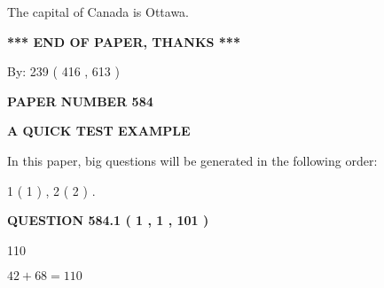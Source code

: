 \documentclass[12pt]{article}
\begin{document}
 
The capital of Canada is Ottawa.
 
 
 
 
   
   
 \vspace{0.2in}
 
   
   
   
   
\vspace{1.0in} 
{\textbf{\large{ *** END OF PAPER, THANKS *** }}} 
   
   
\hspace{1.0in} By: 
 239 ( 416 ,  613 )
   
   
   
   
\newpage 
\setcounter{page}{ 
   584001 } 
   
   
   
   
 {\textbf{ \Large{ PAPER NUMBER  584  }}}
   
   
\vspace{0.2in}
   
   
   
   
   
   
 \vspace{0.2in}
{\LARGE {\textbf{ A QUICK TEST EXAMPLE}}}
   
   
   
\vspace{0.2in}
   
In this paper, big questions will be generated in the following order: 
   
   
   1 ( 1 )
 ,
   2 ( 2 )
 .
  
\vspace{0.2in}
  
{\textbf{\Large{QUESTION
584.1 
 ( 1 , 1 , 101 )
}}}
  
  
 
 
\noindent{}

110
 
 
 
 
\noindent{}

$ %
42 +  %
68=   %
110$
 
 
  
\vspace{0.2in}
  
\end{document}
